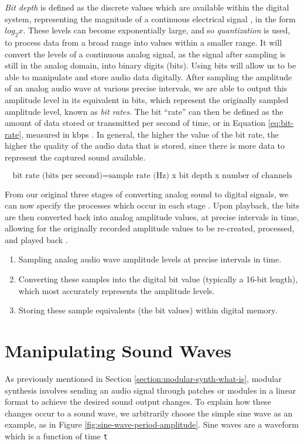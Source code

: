 \textit{Bit depth} is defined as the discrete values which are available within the digital system, representing the magnitude of a continuous electrical signal \cite{Zjalic_2021}, in the form $log_2{x}$. These levels can become exponentially large, and so \textit{quantization} is used, to process data from a broad range into values within a smaller range. It will convert the levels of a continuous analog signal, as the signal after sampling is still in the analog domain, into binary digits (bits). Using bits will allow us to be able to manipulate and store audio data digitally. After sampling the amplitude of an analog audio wave at various precise intervals, we are able to output this amplitude level in its equivalent in bits, which represent the originally sampled amplitude level, known as \textit{bit rates}. The bit ``rate'' can then be defined as the amount of data stored or transmitted per second of time, or in Equation \ref{eq:bit-rate}, measured in kbps \cite{Zjalic_2021}. In general, the higher the value of the bit rate, the higher the quality of the audio data that is stored, since there is more data to represent the captured sound available.

\begin{equation}
	\textrm{bit rate (bits per second)} = \textrm{sample rate (Hz) x } \textrm{bit depth x } \textrm{number of channels}
	\label{eq:bit-rate}	
\end{equation}

From our original three stages of converting analog sound to digital signals, we can now specify the processes which occur in each stage \cite{Huber_Runstein_2018}. Upon playback, the bits are then converted back into analog amplitude values, at precise intervals in time, allowing for the originally recorded amplitude values to be re-created, processed, and played back \cite{Huber_Runstein_2018}. 

\begin{enumerate}
	\item Sampling analog audio wave amplitude levels at precise intervals in time.
	\item Converting these samples into the digital bit value (typically a 16-bit length), which most accurately represents the amplitude levels.
	\item Storing these sample equivalents (the bit values) within digital memory.
\end{enumerate}


\section{Manipulating Sound Waves}\label{section:manip-waves}
As previously mentioned in Section \ref{section:modular-synth-what-is}, modular synthesis involves sending an audio signal through patches or modules in a linear format to achieve the desired sound output changes. To explain how these changes occur to a sound wave, we arbitrarily choose the simple sine wave as an example, as in Figure \ref{fig:sine-wave-period-amplitude}. Sine waves are a waveform which is a function of time \texttt{t}

